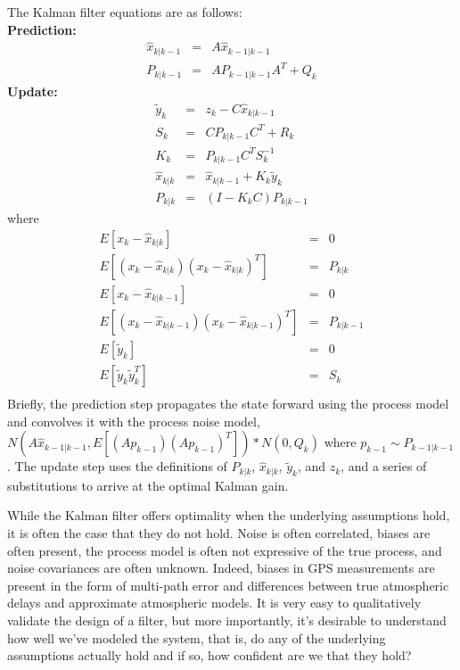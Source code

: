 The Kalman filter equations are as follows:\\
{\bf Prediction:}
\begin{equation}
\begin{aligned}
\hat{x}_{k|k-1} &=& A \hat{x}_{k-1|k-1}\\
P_{k|k-1} &=& A P_{k-1|k-1} A^T + Q_k
\end{aligned}
\end{equation}
{\bf Update:}
\begin{equation}
\begin{aligned}
\tilde{y}_k &=& z_k - C \hat{x}_{k|k-1}\\
S_k &=& C P_{k|k-1} C^T + R_k\\
K_k &=& P_{k|k-1} C^T S_k^{-1}\\
\hat{x}_{k|k} &=& \hat{x}_{k|k-1} + K_k \tilde{y}_k\\
P_{k|k} &=& (I - K_k C) P_{k|k-1}
\end{aligned}
\end{equation}
where
\begin{equation}
\begin{aligned}
E[x_k - \hat{x}_{k|k}] &=& 0\\
E[(x_k - \hat{x}_{k|k})(x_k - \hat{x}_{k|k})^T] &=& P_{k|k}\\
E[x_k - \hat{x}_{k|k-1}] &=& 0\\
E[(x_k - \hat{x}_{k|k-1})(x_k - \hat{x}_{k|k-1})^T] &=& P_{k|k-1}\\
E[\tilde{y}_k] &=& 0\\
E[\tilde{y}_k\tilde{y}_k^T] &=& S_k\\
\end{aligned}
\end{equation}
Briefly, the prediction step propagates the state forward using the process model and convolves it with the process noise model, $N(A\hat{x}_{k-1|k-1}, E[(Ap_{k-1})(Ap_{k-1})^T]) \ast N(0, Q_k)$ where $p_{k-1} \sim P_{k-1|k-1}$.
 The update step uses the definitions of $P_{k|k}$, $\hat{x}_{k|k}$, $\tilde{y}_k$, and $z_k$, and a series of substitutions to arrive at the optimal Kalman gain.

While the Kalman filter offers optimality when the underlying assumptions hold, it is often the case that they do not hold.  Noise is often correlated, biases are often present, the process model is often not expressive of the true process, and noise covariances are often unknown.  Indeed, biases in GPS measurements are present in the form of multi-path error and differences between true atmospheric delays and approximate atmospheric models.  It is very easy to qualitatively validate the design of a filter, but more importantly, it's desirable to understand how well we've modeled the system, that is, do any of the underlying assumptions actually hold and if so, how confident are we that they hold?

